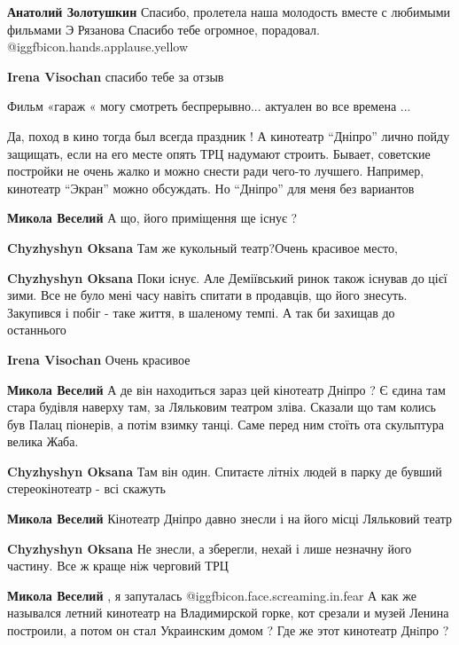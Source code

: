 \begin{itemize}
\textbf{Анатолий Золотушкин} Спасибо, пролетела наша молодость вместе с любимыми фильмами Э Рязанова Спасибо тебе огромное, порадовал. @igg{fbicon.hands.applause.yellow} 

\textbf{Irena Visochan} спасибо тебе за отзыв

Фильм «гараж « могу смотреть беспрерывно... актуален во все времена ...


Да, поход в кино тогда был всегда праздник ! А кинотеатр \enquote{Дніпро} лично пойду
защищать, если на его месте опять ТРЦ надумают строить. Бывает, советские
постройки не очень жалко и можно снести ради чего-то лучшего. Например,
кинотеатр \enquote{Экран} можно обсуждать. Но \enquote{Дніпро} для меня без вариантов

\begin{itemize} %
\textbf{Микола Веселий}
А що, його приміщення ще існує ?

\begin{itemize} %
\textbf{Chyzhyshyn Oksana} Там же кукольный театр?Очень красивое место,

\textbf{Chyzhyshyn Oksana} Поки існує. Але Деміївський ринок також існував до цієї зими. Все не було мені часу навіть спитати в продавців, що його знесуть. Закупився і побіг - таке життя, в шаленому темпі. А так би захищав до останнього

\textbf{Irena Visochan} Очень красивое

\textbf{Микола Веселий}
А де він находиться зараз цей кінотеатр Дніпро ?
Є єдина там стара будівля наверху там, за Ляльковим театром зліва.
Сказали що там колись був Палац піонерів, а потім взимку танці.
Саме перед ним стоїть ота скульптура велика Жаба.

\textbf{Chyzhyshyn Oksana} Там він один. Спитаєте літніх людей в парку де бувший стереокінотеатр - всі скажуть

\textbf{Микола Веселий}
Кінотеатр Дніпро давно знесли і на його місці Ляльковий театр

\textbf{Chyzhyshyn Oksana} Не знесли, а зберегли, нехай і лише незначну його частину. Все ж краще ніж черговий ТРЦ
\end{itemize} %

\textbf{Микола Веселий} , я запуталась  @igg{fbicon.face.screaming.in.fear} 
А как же назывался летний кинотеатр на Владимирской горке, кот срезали и музей Ленина построили, а потом он стал Украинским домом ?
Где же этот кинотеатр Днiпро ?


\end{itemize}
\end{itemize}
